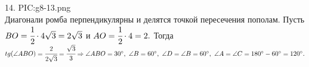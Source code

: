 14. {{PIC:g8-13.png}}\\
Диагонали ромба перпендикулярны и делятся точкой пересечения пополам. Пусть $BO=\cfrac{1}{2}\cdot4\sqrt{3}=2\sqrt{3}$ и $AO=\cfrac{1}{2}\cdot4=2.$ Тогда $tg(\angle ABO)=\cfrac{2}{2\sqrt{3}}=\cfrac{\sqrt{3}}{3}\Rightarrow \angle ABO =30^\circ,\ \angle B=60^\circ,\ \angle D=\angle B=60^\circ,\ \angle A=\angle C=180^\circ-60^\circ=120^\circ.$\\
